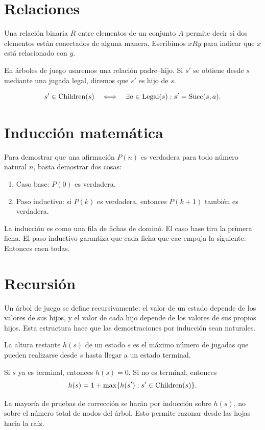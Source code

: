 \section{Relaciones}

\begin{definition}
Una relación binaria $R$ entre elementos de un conjunto $A$ permite decir si dos elementos están conectados de alguna manera. Escribimos $xRy$ para indicar que $x$ está relacionado con $y$.
\end{definition}

En árboles de juego usaremos una relación padre--hijo. Si $s'$ se obtiene desde $s$ mediante una jugada legal, diremos que $s'$ es hijo de $s$.

\[
 s' \in \operatorname{Children}(s) \quad \Longleftrightarrow \quad \exists a\in\operatorname{Legal}(s): s'=\operatorname{Succ}(s,a).
\]

\section{Inducción matemática}

\begin{definition}
Para demostrar que una afirmación $P(n)$ es verdadera para todo número natural $n$, basta demostrar dos cosas:
\begin{enumerate}[nosep]
\item Caso base: $P(0)$ es verdadera.
\item Paso inductivo: si $P(k)$ es verdadera, entonces $P(k+1)$ también es verdadera.
\end{enumerate}
\end{definition}

\begin{intuitionbox}
La inducción es como una fila de fichas de dominó. El caso base tira la primera ficha. El paso inductivo garantiza que cada ficha que cae empuja la siguiente. Entonces caen todas.
\end{intuitionbox}

\section{Recursión}

Un árbol de juego se define recursivamente: el valor de un estado depende de los valores de sus hijos, y el valor de cada hijo depende de los valores de sus propios hijos. Esta estructura hace que las demostraciones por inducción sean naturales.

\begin{definition}
La altura restante $h(s)$ de un estado $s$ es el máximo número de jugadas que pueden realizarse desde $s$ hasta llegar a un estado terminal.
\end{definition}

Si $s$ ya es terminal, entonces $h(s)=0$. Si no es terminal, entonces
\[
 h(s)=1+\max\{h(s'):s'\in\operatorname{Children}(s)\}.
\]

La mayoría de pruebas de corrección se harán por inducción sobre $h(s)$, no sobre el número total de nodos del árbol. Esto permite razonar desde las hojas hacia la raíz.

